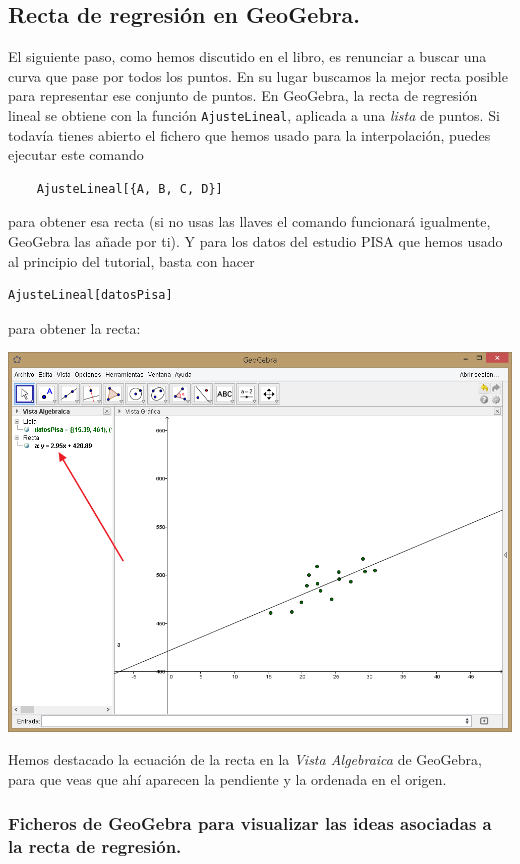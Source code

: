 \documentclass[10pt,a4paper]{article}\usepackage[]{graphicx}\usepackage[]{color}
\begin{document}
\subsection{Recta de regresión en GeoGebra.}

El siguiente paso, como hemos discutido en el libro, es renunciar a buscar una curva que pase por todos los puntos. En su lugar buscamos la mejor recta posible para representar ese conjunto de puntos. En GeoGebra, la recta de regresión lineal se obtiene con la función {\tt AjusteLineal}, aplicada a una {\em lista} de puntos. Si todavía tienes abierto el fichero que hemos usado para la interpolación, puedes ejecutar este comando
  \begin{verbatim}
    AjusteLineal[{A, B, C, D}]
  \end{verbatim}
para obtener esa recta (si no usas las llaves el comando funcionará igualmente, GeoGebra las añade por ti). Y para los datos del estudio PISA que hemos usado al principio del tutorial, basta con hacer
\begin{verbatim}
AjusteLineal[datosPisa]
\end{verbatim}
para obtener la recta:
\begin{center}
    \includegraphics[width=15cm]{../fig/Tut10-19.png}
\end{center}
Hemos destacado la ecuación de la recta en la {\em Vista Algebraica} de GeoGebra, para que veas que ahí aparecen la pendiente y la ordenada en el origen.

\subsubsection*{Ficheros de GeoGebra para visualizar las ideas asociadas a la recta de regresión.}
\end{document}
